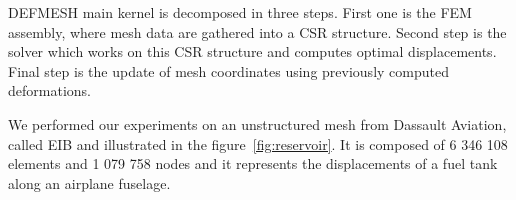 \documentclass{IOS-Book-Article}
\begin{document}
DEFMESH main kernel is decomposed in three steps.
First one is the FEM assembly, where mesh data are gathered into a CSR structure.
Second step is the solver which works on this CSR structure and computes optimal displacements.
Final step is the update of mesh coordinates using previously computed deformations.

We performed our experiments on an unstructured mesh from Dassault Aviation, called EIB and illustrated in the figure~\ref{fig:reservoir}.
It is composed of 6 346 108 elements and 1 079 758 nodes and it represents the displacements of a fuel tank along an airplane fuselage.
\begin{figure}[htp]
 \centering

\end{figure}
\end{document}
